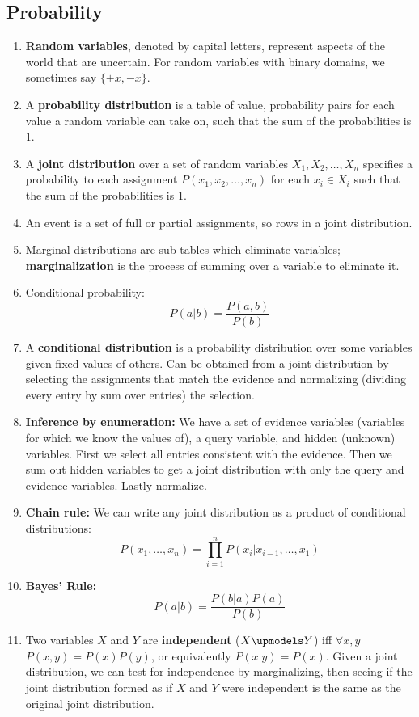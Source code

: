 \documentclass[10pt]{article}
\begin{document}
\begin{multicols}{2}
\begin{enumerate}
        \subsection{Probability}
        \begin{enumerate}
            \item \textbf{Random variables}, denoted by capital letters, represent aspects of the world that are uncertain. For random variables with binary domains, we sometimes say $\{+x, -x\}$.
            \item A \textbf{probability distribution} is a table of value, probability pairs for each value a random variable can take on, such that the sum of the probabilities is 1.
            \item A \textbf{joint distribution} over a set of random variables $X_1, X_2, \hdots, X_n$ specifies a probability to each assignment $P(x_1, x_2, \hdots, x_n)$ for each $x_i \in X_i$ such that the sum of the probabilities is 1.
            \item An event is a set of full or partial assignments, so rows in a joint distribution. 
            \item Marginal distributions are sub-tables which eliminate variables; \textbf{marginalization} is the process of summing over a variable to eliminate it. 
            \item Conditional probability:
            $$P(a|b) = \frac{P(a,b)}{P(b)}$$
            \item A \textbf{conditional distribution} is a probability distribution over some variables given fixed values of others. Can be obtained from a joint distribution by selecting the assignments that match the evidence and normalizing (dividing every entry by sum over entries) the selection.
            \item \textbf{Inference by enumeration:} We have a set of evidence variables (variables for which we know the values of), a query variable, and hidden (unknown) variables. First we select all entries consistent with the evidence. Then we sum out hidden variables to get a joint distribution with only the query and evidence variables. Lastly normalize.
            \item \textbf{Chain rule:} We can write any joint distribution as a product of conditional distributions:
            $$P(x_1, \ldots, x_n) = \prod_{i=1}^{n} P(x_i | x_{i-1}, \ldots, x_1)$$
            \item \textbf{Bayes' Rule:} $$P(a|b) = \frac{P(b|a)P(a)}{P(b)}$$
            \item Two variables $X$ and $Y$ are \textbf{independent} ($X \upmodels Y$) iff  $\forall x, y$ $P(x,y)=P(x)P(y)$, or equivalently $P(x|y)=P(x)$. Given a joint distribution, we can test for independence by marginalizing, then seeing if the joint distribution formed as if $X$ and $Y$ were independent is the same as the original joint distribution.

\end{enumerate}
\end{enumerate}
\end{multicols}
\end{document}
